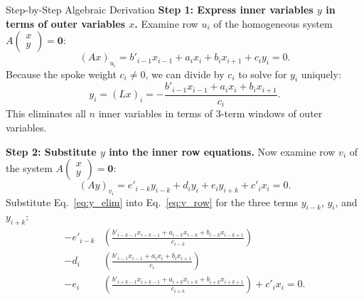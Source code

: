 \documentclass[11pt]{article}
\begin{document}
\begin{defbox}{Step-by-Step Algebraic Derivation}
\noindent\textbf{Step 1: Express inner variables $y$ in terms of outer variables $x$.}
Examine row $u_i$ of the homogeneous system $A \begin{pmatrix} x \\ y \end{pmatrix} = \mathbf{0}$:
\begin{equation}
  (Ax)_{u_i} = b'_{i-1} x_{i-1} + a_i x_i + b_i x_{i+1} + c_i y_i = 0.
\end{equation}
Because the spoke weight $c_i \ne 0$, we can divide by $c_i$ to solve for $y_i$ uniquely:
\begin{equation}
  y_i = (Lx)_i = -\frac{b'_{i-1} x_{i-1} + a_i x_i + b_i x_{i+1}}{c_i}. \label{eq:y_elim}
\end{equation}
This eliminates all $n$ inner variables in terms of 3-term windows of outer variables.

\noindent\textbf{Step 2: Substitute $y$ into the inner row equations.}
Now examine row $v_i$ of the system $A \begin{pmatrix} x \\ y \end{pmatrix} = \mathbf{0}$:
\begin{equation}
  (Ay)_{v_i} = e'_{i-k} y_{i-k} + d_i y_i + e_i y_{i+k} + c'_i x_i = 0. \label{eq:v_row}
\end{equation}
Substitute Eq.~\eqref{eq:y_elim} into Eq.~\eqref{eq:v_row} for the three terms $y_{i-k}$, $y_i$, and $y_{i+k}$:
\begin{align}
  -e'_{i-k} &\left( \frac{b'_{i-k-1} x_{i-k-1} + a_{i-k} x_{i-k} + b_{i-k} x_{i-k+1}}{c_{i-k}} \right) \nonumber \\
  -d_i &\left( \frac{b'_{i-1} x_{i-1} + a_i x_i + b_i x_{i+1}}{c_i} \right) \nonumber \\
  -e_i &\left( \frac{b'_{i+k-1} x_{i+k-1} + a_{i+k} x_{i+k} + b_{i+k} x_{i+k+1}}{c_{i+k}} \right) + c'_i x_i = 0. \label{eq:full_recurrence}
\end{align}


\end{defbox}
\end{document}
